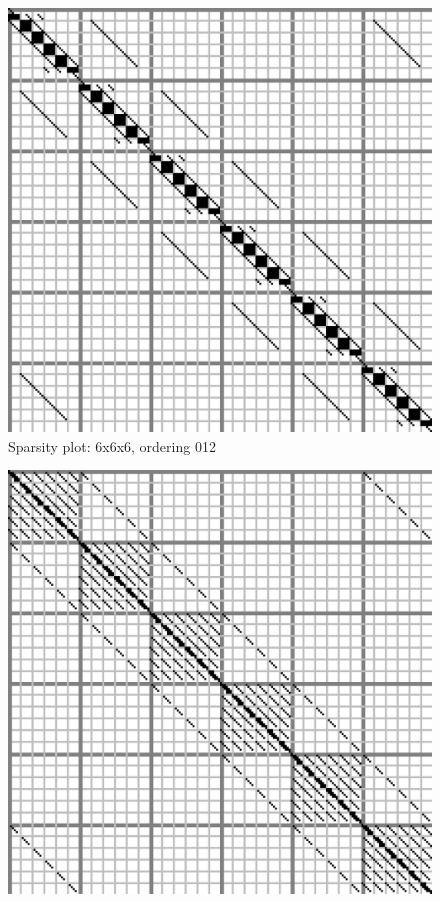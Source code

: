 \documentclass[10pt]{article}
\begin{document}
\begin{multicols}{2}
\begin{center}
\noindent
\begin{minipage}[t]{.5\textwidth}%
\begin{figure}[H]
	\centering
	\includegraphics[width=\spwidth]{../img/sparsity/int_small_6x6x6_012.eps}
	\caption{Sparsity plot: 6x6x6, ordering 012 }
\end{figure}
\vspace{\spmgin}
\begin{figure}[H]
	\centering
	\includegraphics[width=\spwidth]{../img/sparsity/int_small_6x6x6_021.eps}

\end{figure}
\end{minipage}
\end{center}
\end{multicols}
\end{document}
